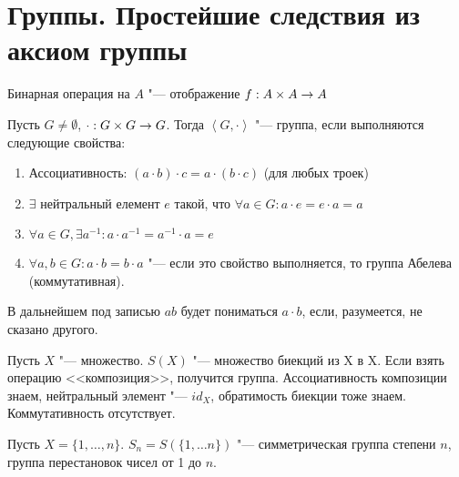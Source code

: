 \section{Группы. Простейшие следствия из аксиом группы}
\begin{Def}
	Бинарная операция на $A$ "--- отображение $f : A \times A \rightarrow A$
\end{Def}

\begin{Def}
Пусть $G \neq \emptyset$, $\cdot : G \times G \rightarrow G$.
Тогда $\left<G, \cdot \right>$ "--- группа, если выполняются следующие свойства:
\begin{enumerate}
	\item Ассоциативность: $(a \cdot b) \cdot c = a \cdot (b \cdot c)$ (для любых троек)
	\item $\exists$ нейтральный елемент $e$ такой, что $\forall a \in G \colon a \cdot e = e \cdot a = a$ 
	\item $\forall a \in G, \exists a^{-1} \colon a \cdot a^{-1} = a^{-1} \cdot a = e$		
	\item $\forall a, b \in G \colon a \cdot b = b \cdot a$ "--- если это свойство выполняется, то группа Абелева (коммутативная).
\end{enumerate}
\end{Def}

В дальнейшем под записью $ab$ будет пониматься $a \cdot b$, если, разумеется, не сказано другого.

\begin{exmp}
Пусть $X$ "--- множество. $S(X)$ "--- множество биекций из X в X.
Если взять операцию <<композиция>>, получится группа. Ассоциативность композиции знаем,
нейтральный элемент "--- $id_X$, обратимость биекции тоже знаем. Коммутативность отсутствует.
\end{exmp}

\begin{exmp}
Пусть $X = \{1, \ldots, n\}$. $S_n = S(\{1, \ldots n\})$ "--- симметрическая группа степени $n$,
группа перестановок чисел от 1 до $n$.
\end{exmp}
	
